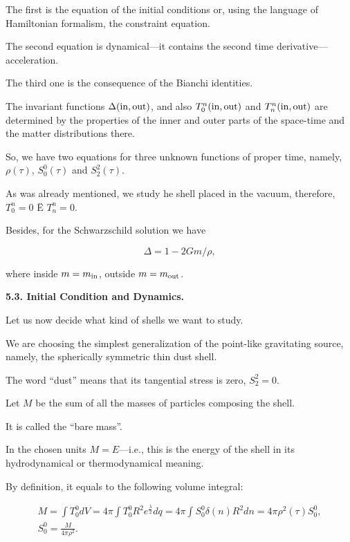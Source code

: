 The first is the equation of the initial conditions or, using the language of Hamiltonian formalism, the constraint equation. 

The second equation is dyna\-mical---it contains the second time derivative---acceleration. 

The third one is the consequence of the Bianchi identities. 

The invariant functions $\Delta (\rm in, out)$, and also $T_0^n (\rm in, out)$ and $T^n_n (\rm in, out)$ are determined by the properties of the inner and outer parts of the space-time and the matter distributions there. 

So, we have two equations for three unknown functions of proper time, namely, $\rho (\tau)$, $S_0^0 (\tau)$ and $S^2_2 (\tau)$. 

As was already mentioned, we study he shell placed in the vacuum, therefore, $T_0^n = 0$ Ë $T^n_n = 0$. 

Besides, for the Schwarzschild solution we have 

\begin{equation}

\label{deltasch}

\Delta = 1 - {2 G m}/{\rho} ,

\end{equation}

where inside $m = m_{\rm in}$, outside $m = m_{\rm out}$.



\smallskip



\textbf{5.3.  Initial Condition and Dynamics.}

Let us now decide what kind of shells we want to study. 

We are choosing the simplest generalization of the point-like gravitating source, namely, the spherically symmetric thin dust shell. 

The word ``dust'' means that its tangential stress is zero, $S^2_2 = 0$. 

Let $M$ be the sum of all the masses of particles composing the shell. 

It is called the ``bare mass''. 

In the chosen units $M = E$---i.e., this is the energy of the shell in its hydrodynamical or thermodynamical meaning. 

By definition, it equals to the following volume integral:

\begin{gather}

\label{bare}

M = \int T^0_0 dV = 4 \pi \int T^0_0 R^2 e^{\frac{\lambda}{2}} dq = 4 \pi \int S^0_0 \delta (n) R^2 dn = 4 \pi \rho^2(\tau) S^0_0 ,

\\

\label{s00}

S^0_0 = \frac{M}{4 \pi \rho^2} .

\end{gather}



